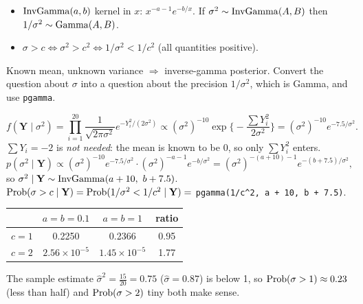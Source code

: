 \documentclass[11pt]{article}
\begin{document}
\begin{recall}
\begin{itemize}
\item $\mathrm{InvGamma}(a,b)$ kernel in $x$: $x^{-a-1}e^{-b/x}$. If $\sigma^2\sim\mathrm{InvGamma}(A,B)$ then $1/\sigma^2\sim\mathrm{Gamma}(A,B)$.
\item $\sigma>c\iff\sigma^2>c^2\iff1/\sigma^2<1/c^2$ (all quantities positive).
\end{itemize}
\end{recall}

\begin{keyidea}
Known mean, unknown variance $\Rightarrow$ inverse-gamma posterior. Convert the question about $\sigma$ into a question about the precision $1/\sigma^2$, which is Gamma, and use \texttt{pgamma}.
\end{keyidea}

\solution
{}
\[
f(\mathbf Y\mid\sigma^2)=\prod_{i=1}^{20}\frac{1}{\sqrt{2\pi\sigma^2}}e^{-Y_i^2/(2\sigma^2)}\propto(\sigma^2)^{-10}\exp\Big\{-\frac{\sum Y_i^2}{2\sigma^2}\Big\}=(\sigma^2)^{-10}e^{-7.5/\sigma^2}.
\]
$\sum Y_i=-2$ is \emph{not needed}: the mean is known to be 0, so only $\sum Y_i^2$ enters.
\[
p(\sigma^2\mid\mathbf Y)\propto(\sigma^2)^{-10}e^{-7.5/\sigma^2}\cdot(\sigma^2)^{-a-1}e^{-b/\sigma^2}=(\sigma^2)^{-(a+10)-1}e^{-(b+7.5)/\sigma^2},
\]
so $\sigma^2\mid\mathbf Y\sim\mathrm{InvGamma}(a+10,\ b+7.5)$.
$\mathrm{Prob}(\sigma>c\mid\mathbf Y)=\mathrm{Prob}(1/\sigma^2<1/c^2\mid\mathbf Y)=$ \texttt{pgamma(1/c\^{}2, a + 10, b + 7.5)}.
\begin{center}
\begin{tabular}{c|cc|c}\toprule
 & $a=b=0.1$ & $a=b=1$ & ratio\\\midrule
$c=1$ & 0.2250 & 0.2366 & 0.95\\
$c=2$ & $2.56\times10^{-5}$ & $1.45\times10^{-5}$ & 1.77\\\bottomrule
\end{tabular}
\end{center}

\begin{sanity}
The sample estimate $\hat\sigma^2=\frac{15}{20}=0.75$ ($\hat\sigma=0.87$) is below 1, so $\mathrm{Prob}(\sigma>1)\approx0.23$ (less than half) and $\mathrm{Prob}(\sigma>2)$ tiny both make sense. \checkmark
\end{sanity}
\end{document}
